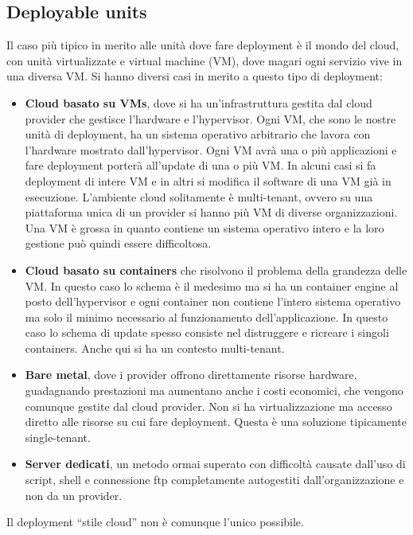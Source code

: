 \subsection{Deployable units}
Il caso più tipico in merito alle unità dove fare deployment è il mondo del cloud,
con unità virtualizzate e virtual machine (VM), dove magari ogni servizio vive in
una diversa VM. Si hanno diversi casi in merito a questo tipo di deployment:
\begin{itemize}
      \item \textbf{Cloud basato su VMs}, dove si ha un'infrastruttura gestita dal
            cloud provider che gestisce l'hardware e l'hypervisor. Ogni VM, che
            sono le nostre unità di deployment, ha un sistema operativo arbitrario
            che lavora con l'hardware mostrato dall'hypervisor. Ogni VM avrà una
            o più applicazioni e fare deployment porterà all'update di una o più
            VM. In alcuni casi si fa deployment di intere VM e in altri si modifica
            il software di una VM già in esecuzione. L'ambiente cloud solitamente
            è multi-tenant, ovvero su una piattaforma unica di un provider si
            hanno più VM di diverse organizzazioni.
            Una VM è grossa in quanto contiene un sistema operativo intero e la loro
            gestione può quindi essere difficoltosa.
      \item \textbf{Cloud basato su containers} che risolvono il problema della
            grandezza delle VM. In questo caso lo schema è il medesimo ma si ha
            un container engine al posto dell'hypervisor e ogni container non
            contiene l'intero sistema operativo ma solo il minimo necessario al
            funzionamento dell'applicazione. In questo caso lo schema di update
            spesso consiste nel distruggere e ricreare i singoli containers.
            Anche qui si ha un contesto multi-tenant.
      \item \textbf{Bare metal}, dove i provider offrono direttamente risorse
            hardware, guadagnando prestazioni ma aumentano anche i costi economici,
            che vengono comunque gestite dal cloud provider. Non si ha virtualizzazione
            ma accesso diretto alle risorse su cui fare deployment. Questa è una
            soluzione tipicamente single-tenant.
      \item \textbf{Server dedicati}, un metodo ormai superato con difficoltà causate
            dall'uso di script, shell e connessione ftp completamente autogestiti
            dall'organizzazione e non da un provider.
\end{itemize}
Il deployment “stile cloud” non è comunque l'unico possibile.

